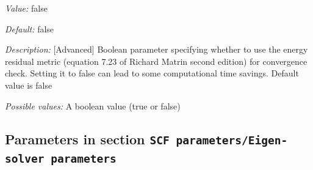 \begin{itemize}
{\it Value:} false


{\it Default:} false


{\it Description:} [Advanced] Boolean parameter specifying whether to use the energy residual metric (equation 7.23 of Richard Matrin second edition) for convergence check. Setting it to false can lead to some computational time savings. Default value is false


{\it Possible values:} A boolean value (true or false)
\end{itemize}



\subsection{Parameters in section \tt SCF parameters/Eigen-solver parameters}
\label{parameters:SCF_20parameters/Eigen_2dsolver_20parameters}

